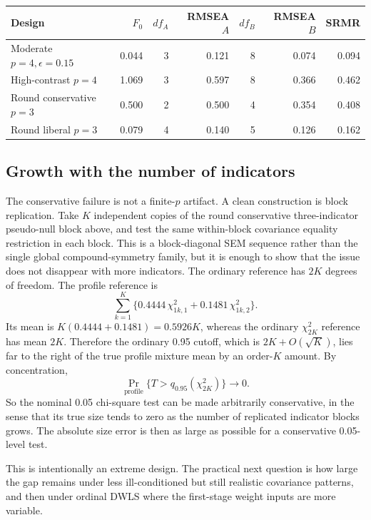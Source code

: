 \documentclass[11pt]{article}
\begin{document}
\begin{center}
\begin{tabular}{lrrrrrr}
\toprule
Design & \(F_0\) & \(df_A\) & RMSEA \(A\) & \(df_B\) & RMSEA \(B\) & SRMR \\
\midrule
Moderate \(p=4,\epsilon=0.15\) & 0.044 & 3 & 0.121 & 8 & 0.074 & 0.094 \\
High-contrast \(p=4\) & 1.069 & 3 & 0.597 & 8 & 0.366 & 0.462 \\
Round conservative \(p=3\) & 0.500 & 2 & 0.500 & 4 & 0.354 & 0.408 \\
Round liberal \(p=3\) & 0.079 & 4 & 0.140 & 5 & 0.126 & 0.162 \\
\bottomrule
\end{tabular}
\end{center}

\subsection*{Growth with the number of indicators}

The conservative failure is not a finite-\(p\) artifact. A clean construction is
block replication. Take \(K\) independent copies of the round conservative
three-indicator pseudo-null block above, and test the same within-block
covariance equality restriction in each block. This is a block-diagonal SEM
sequence rather than the single global compound-symmetry family, but it is
enough to show that the issue does not disappear with more indicators. The
ordinary reference has \(2K\) degrees of freedom. The profile reference is
\[
  \sum_{k=1}^{K}\{0.4444\,\chi^2_{1k,1}+0.1481\,\chi^2_{1k,2}\}.
\]
Its mean is \(K(0.4444+0.1481)=0.5926K\), whereas the ordinary
\(\chi^2_{2K}\) reference has mean \(2K\). Therefore the ordinary 0.95 cutoff,
which is \(2K+O(\sqrt K)\), lies far to the right of the true profile mixture
mean by an order-\(K\) amount. By concentration,
\[
  \Pr_{\mathrm{profile}}\{T>q_{0.95}(\chi^2_{2K})\}\to 0.
\]
So the nominal 0.05 chi-square test can be made arbitrarily conservative, in
the sense that its true size tends to zero as the number of replicated
indicator blocks grows. The absolute size error is then as large as possible
for a conservative 0.05-level test.

This is intentionally an extreme design. The practical next question is how
large the gap remains under less ill-conditioned but still realistic covariance
patterns, and then under ordinal DWLS where the first-stage weight inputs are
more variable.
\end{document}
